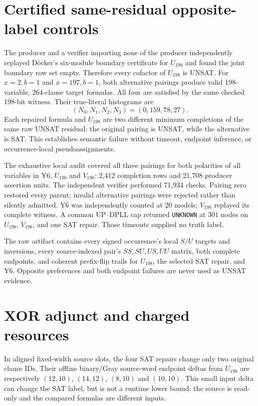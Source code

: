 \documentclass[11pt]{article}
\begin{document}
\section{Certified same-residual opposite-label controls}
The producer and a verifier importing none of the producer independently
replayed D\"ocker's six-module boundary certificate for $U_{198}$ and found
the joint boundary row set empty.  Therefore every cofactor of $U_{198}$ is
UNSAT.  For $x=2,b=1$ and $x=197,b=1$, both alternative pairings produce
valid 198-variable, 264-clause target formulas.  All four are satisfied by
the same checked 198-bit witness.  Their true-literal histograms are
\[
(N_0,N_1,N_2,N_3)=(0,159,78,27).
\]
Each repaired formula and $U_{198}$ are two different minimum completions of
the same raw UNSAT residual: the original pairing is UNSAT, while the
alternative is SAT.  This establishes semantic failure without timeout,
endpoint inference, or occurrence-local pseudoassignments.

The exhaustive local audit covered all three pairings for both polarities of
all variables in Y6, $U_{198}$ and $V_{198}$: 2,412 completion rows and
21,708 producer assertion units.  The independent verifier performed 71,934
checks.  Pairing zero restored every parent; invalid alternative pairings
were rejected rather than silently admitted.  Y6 was independently counted
at 20 models; $V_{198}$ replayed its complete witness.  A common UP--DPLL
cap returned \texttt{UNKNOWN} at 301 nodes on $U_{198}$, $V_{198}$, and one
SAT repair.  Those timeouts supplied no truth label.

The raw artifact contains every signed occurrence's local $S/U$ targets and
inversions, every source-indexed pair's $SS,SU,US,UU$ matrix, both complete
endpoints, and coherent prefix-flip trails for $U_{198}$, the selected SAT
repair, and Y6.  Opposite preferences and both endpoint failures are never
used as UNSAT evidence.

\section{XOR adjunct and charged resources}
In aligned fixed-width source slots, the four SAT repairs change only two
original clause IDs.  Their offline binary/Gray source-word endpoint deltas
from $U_{198}$ are respectively $(12,10)$, $(14,12)$, $(8,10)$ and
$(10,10)$.  This small input delta can change the SAT label, but is not a
runtime lower bound: the source is read-only and the compared formulas are
different inputs.
\end{document}
